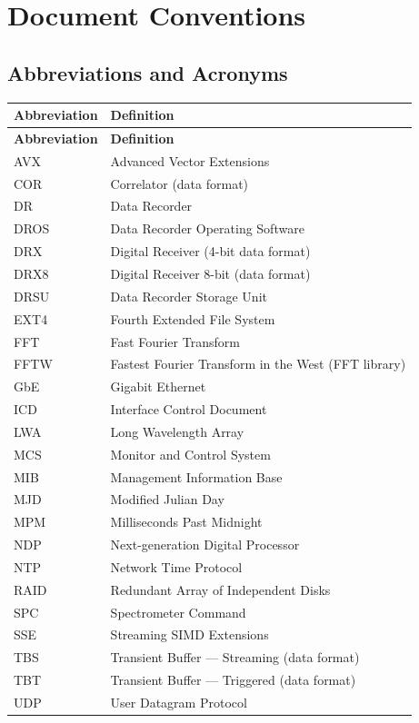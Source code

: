 
\chapter{Document Conventions}
\label{sec:abbreviations}

\section{Abbreviations and Acronyms}

\begin{longtable}{l p{10cm}}
\toprule
\textbf{Abbreviation} & \textbf{Definition} \\
\midrule
\endfirsthead

\toprule
\textbf{Abbreviation} & \textbf{Definition} \\
\midrule
\endhead

\bottomrule
\endfoot

AVX     & Advanced Vector Extensions \\
COR     & Correlator (data format) \\
DR      & Data Recorder \\
DROS    & Data Recorder Operating Software \\
DRX     & Digital Receiver (4-bit data format) \\
DRX8    & Digital Receiver 8-bit (data format) \\
DRSU    & Data Recorder Storage Unit \\
EXT4    & Fourth Extended File System \\
FFT     & Fast Fourier Transform \\
FFTW    & Fastest Fourier Transform in the West (FFT library) \\
GbE     & Gigabit Ethernet \\
ICD     & Interface Control Document \\
LWA     & Long Wavelength Array \\
MCS     & Monitor and Control System \\
MIB     & Management Information Base \\
MJD     & Modified Julian Day \\
MPM     & Milliseconds Past Midnight \\
NDP     & Next-generation Digital Processor \\
NTP     & Network Time Protocol \\
RAID    & Redundant Array of Independent Disks \\
SPC     & Spectrometer Command \\
SSE     & Streaming SIMD Extensions \\
TBS     & Transient Buffer --- Streaming (data format) \\
TBT     & Transient Buffer --- Triggered (data format) \\
UDP     & User Datagram Protocol \\

\end{longtable}

